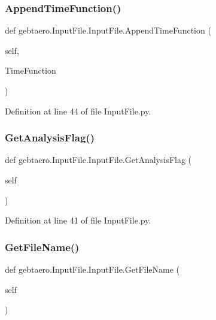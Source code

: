 \subsubsection{\texorpdfstring{Append\+Time\+Function()}{AppendTimeFunction()}}
{\footnotesize\ttfamily def gebtaero.\+Input\+File.\+Input\+File.\+Append\+Time\+Function (\begin{DoxyParamCaption}\item[{}]{self,  }\item[{}]{Time\+Function }\end{DoxyParamCaption})}



Definition at line 44 of file Input\+File.\+py.

\mbox{\label{classgebtaero_1_1_input_file_1_1_input_file_a8d9a4bed8ff821455af85d5440329fe8}} 
\subsubsection{\texorpdfstring{Get\+Analysis\+Flag()}{GetAnalysisFlag()}}
{\footnotesize\ttfamily def gebtaero.\+Input\+File.\+Input\+File.\+Get\+Analysis\+Flag (\begin{DoxyParamCaption}\item[{}]{self }\end{DoxyParamCaption})}



Definition at line 41 of file Input\+File.\+py.

\mbox{\label{classgebtaero_1_1_input_file_1_1_input_file_a3fe8f05410f29d9c555adbee5dae9e16}} 
\subsubsection{\texorpdfstring{Get\+File\+Name()}{GetFileName()}}
{\footnotesize\ttfamily def gebtaero.\+Input\+File.\+Input\+File.\+Get\+File\+Name (\begin{DoxyParamCaption}\item[{}]{self }\end{DoxyParamCaption})}



